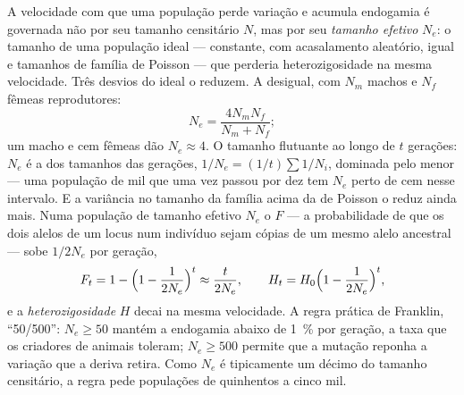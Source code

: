 \begin{theorem}\label{thm:b3:conservation-biology:ne}
A velocidade com que uma população perde variação e acumula endogamia é
governada não por seu tamanho censitário $N$, mas por seu \emph{tamanho
efetivo} $N_{e}$: o tamanho de uma população ideal --- constante, com
acasalamento aleatório,  igual e tamanhos de família de
Poisson --- que perderia heterozigosidade na mesma velocidade. Três
desvios do ideal o reduzem. A  desigual, com $N_{m}$ machos e
$N_{f}$ fêmeas reprodutores:
\[
N_{e} = \frac{4N_{m}N_{f}}{N_{m} + N_{f}} ;
\]
um macho e cem fêmeas dão $N_{e} \approx 4$. O tamanho flutuante ao longo
de $t$ gerações: $N_{e}$ é a \emph{} dos tamanhos das
gerações, $1/N_{e} = (1/t)\sum 1/N_{i}$, dominada pelo menor --- uma
população de mil que uma vez passou por dez tem $N_{e}$ perto de cem
nesse intervalo. E a variância no tamanho da família acima da de Poisson
o reduz ainda mais. Numa população de tamanho efetivo $N_{e}$ o
\emph{} $F$ --- a probabilidade de que os dois
alelos de um locus num indivíduo sejam cópias de um mesmo alelo ancestral
--- sobe $1/2N_{e}$ por geração,
\[
F_{t} = 1 - \Bigl(1 - \frac{1}{2N_{e}}\Bigr)^{t} \approx \frac{t}{2N_{e}},
\qquad H_{t} = H_{0}\Bigl(1 - \frac{1}{2N_{e}}\Bigr)^{t} ,
\]
e a \emph{heterozigosidade} $H$ decai na mesma velocidade. A regra
prática de Franklin, ``50/500'': $N_{e} \ge 50$ mantém a endogamia abaixo
de \qty{1}{\%} por geração, a taxa que os criadores de animais toleram;
$N_{e} \ge
500$ permite que a mutação reponha a variação que a deriva
retira. Como $N_{e}$ é tipicamente um décimo do tamanho censitário, a
regra pede populações de quinhentos a cinco mil.
\end{theorem}
